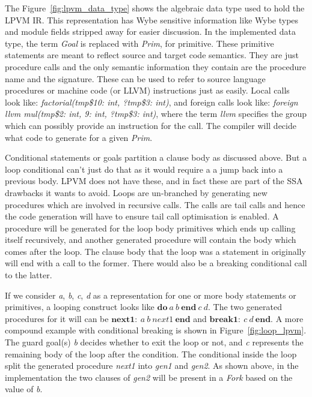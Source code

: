The Figure~\ref{fig:lpvm_data_type} shows the algebraic data type used to hold
the LPVM IR. This representation has Wybe sensitive information like Wybe types
and module fields stripped away for easier discussion. In the implemented data
type, the term \textit{Goal} is replaced with \textit{Prim}, for
primitive. These primitive statements are meant to reflect source and target
code semantics. They are just procedure calls and the only semantic information
they contain are the procedure name and the signature. These can be used to
refer to source language procedures or machine code (or LLVM) instructions just
as easily. Local calls look like: \textit{factorial(tmp\$10: int, ?tmp\$3:
  int)}, and foreign calls look like: \textit{foreign llvm mul(tmp\$2: int, 9:
  int, ?tmp\$3: int)}, where the term \textit{llvm} specifies the group which
can possibly provide an instruction for the call. The compiler will decide what
code to generate for a given \textit{Prim}.

Conditional statements or goals partition a clause body as discussed above. But
a loop conditional can't just do that as it would require a a jump back into a
previous body. LPVM does not have these, and in fact these are part of the SSA
drawbacks it wants to avoid. Loops are un-branched by generating new procedures
which are involved in recursive calls. The calls are tail calls and hence the
code generation will have to ensure tail call optimisation is
enabled. A procedure will be generated for the loop body primitives which ends
up calling itself recursively, and another generated procedure will contain the
body which comes after the loop. The clause body that the loop was a statement
in originally will end with a call to the former. There would also be a
breaking conditional call to the latter.

If we consider \textit{a}, \textit{b}, \textit{c}, \textit{d} as a
representation for one or more body statements or primitives, a looping
construct looks like \( \mathbf{do}\ a\ b\ \mathbf{end}\ c\ d\). The two
generated procedures for it will can be
\( \mathbf{next1:}\ a\ b\ next1\ \mathbf{end} \) and
\( \mathbf{break1:}\ c\ d\ \mathbf{end} \). A more compound example with
conditional breaking is shown in Figure~\ref{fig:loop_lpvm}. The guard goal(s)
\textit{b} decides whether to exit the loop or not, and \textit{c} represents
the remaining body of the loop after the condition. The conditional inside the
loop split the generated procedure \textit{next1} into \textit{gen1} and
\textit{gen2}. As shown above, in the implementation the two clauses of
\textit{gen2} will be present in a \textit{Fork} based on the value of \textit{b}.



